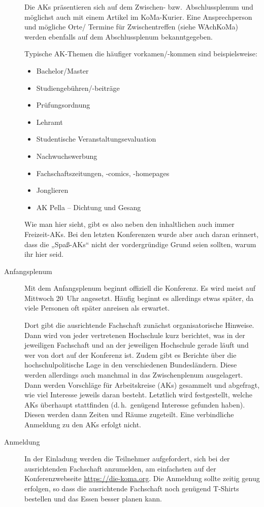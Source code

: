 \begin{description}
	Die AKs präsentieren sich auf dem Zwischen- bzw.\ Abschlussplenum und möglichst
	auch mit einem Artikel im KoMa-Kurier. Eine Ansprechperson und mögliche
	Orte/ Termine für Zwischentreffen (siehe WAchKoMa) werden ebenfalls auf
	dem Abschlussplenum bekanntgegeben.

	Typische AK-Themen die häufiger vorkamen/-kommen sind beispielsweise:
	\begin{itemize}
		\item Bachelor/Master
		\item Studiengebühren/-beiträge
		\item Prüfungsordnung
		\item Lehramt
		\item Studentische Veranstaltungsevaluation
		\item Nachwuchswerbung
		\item Fachschaftszeitungen, -comics, -homepages
		\item Jonglieren
		\item AK Pella -- Dichtung und Gesang
	\end{itemize}
	Wie man hier sieht, gibt es also neben den inhaltlichen auch immer
	Freizeit-AKs. Bei den letzten Konferenzen wurde aber auch daran
	erinnert, dass die „Spaß-AKs“ nicht der vordergründige Grund seien
	sollten, warum ihr hier seid.

\item[Anfangsplenum] Mit dem Anfangsplenum beginnt offiziell die Konferenz. Es
	wird meist auf Mittwoch 20~Uhr angesetzt.  Häufig beginnt es allerdings
	etwas später, da viele Personen oft später anreisen als erwartet.

	Dort gibt die ausrichtende Fachschaft zunächst organisatorische Hinweise. Dann
	wird von jeder vertretenen Hochschule kurz berichtet, was in der
	jeweiligen Fachschaft und an der jeweiligen Hochschule gerade läuft und
	wer von dort auf der Konferenz ist. Zudem gibt es Berichte über die
	hochschulpolitische Lage in den verschiedenen Bundesländern. Diese
	werden allerdings auch manchmal in das Zwischenplenum ausgelagert. Dann
	werden Vorschläge für Arbeitskreise (AKs) gesammelt und abgefragt, wie
	viel Interesse jeweils daran besteht. Letztlich wird festgestellt,
	welche AKs überhaupt stattfinden (d.\,h.\ genügend Interesse gefunden
	haben). Diesen werden dann Zeiten und Räume zugeteilt. Eine
	verbindliche Anmeldung zu den AKs erfolgt nicht.

\item[Anmeldung] In der Einladung werden die Teilnehmer aufgefordert, sich bei
	der ausrichtenden Fachschaft anzumelden, am einfachsten auf der
	Konferenzwebseite \url{https://die-koma.org}. Die Anmeldung sollte zeitig
	genug erfolgen, so dass die ausrichtende Fachschaft noch genügend T-Shirts
	bestellen und das Essen besser planen kann.


\end{description}
